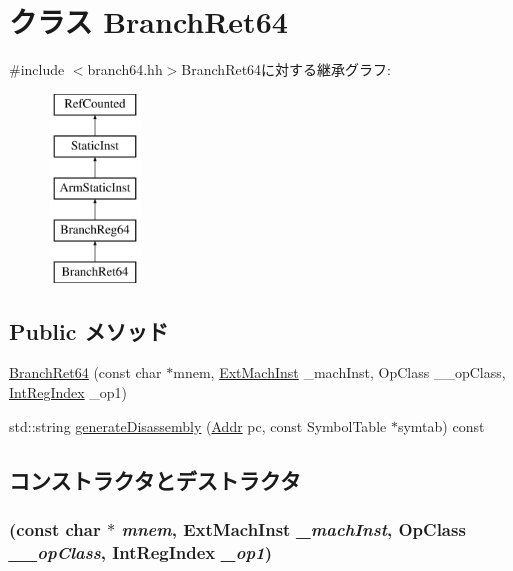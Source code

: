 \hypertarget{classArmISA_1_1BranchRet64}{
\section{クラス BranchRet64}
\label{classArmISA_1_1BranchRet64}
}


{\ttfamily \#include $<$branch64.hh$>$}BranchRet64に対する継承グラフ:\begin{figure}[H]
\begin{center}
\leavevmode
\includegraphics[height=5cm]{classArmISA_1_1BranchRet64}
\end{center}
\end{figure}
\subsection*{Public メソッド}
\begin{DoxyCompactItemize}
\item 
\hyperlink{classArmISA_1_1BranchRet64_a7cc6823b15b5589b231b0f2defb8e163}{BranchRet64} (const char $\ast$mnem, \hyperlink{classStaticInst_a5605d4fc727eae9e595325c90c0ec108}{ExtMachInst} \_\-machInst, OpClass \_\-\_\-opClass, \hyperlink{namespaceArmISA_ae64680ba9fb526106829d6bf92fc791b}{IntRegIndex} \_\-op1)
\item 
std::string \hyperlink{classArmISA_1_1BranchRet64_a95d323a22a5f07e14d6b4c9385a91896}{generateDisassembly} (\hyperlink{classm5_1_1params_1_1Addr}{Addr} pc, const SymbolTable $\ast$symtab) const 
\end{DoxyCompactItemize}


\subsection{コンストラクタとデストラクタ}
\hypertarget{classArmISA_1_1BranchRet64_a7cc6823b15b5589b231b0f2defb8e163}{
\subsubsection[{BranchRet64}]{ (const char $\ast$ {\em mnem}, \/  {\bf ExtMachInst} {\em \_\-machInst}, \/  OpClass {\em \_\-\_\-opClass}, \/  {\bf IntRegIndex} {\em \_\-op1})}}
\label{classArmISA_1_1BranchRet64_a7cc6823b15b5589b231b0f2defb8e163}



